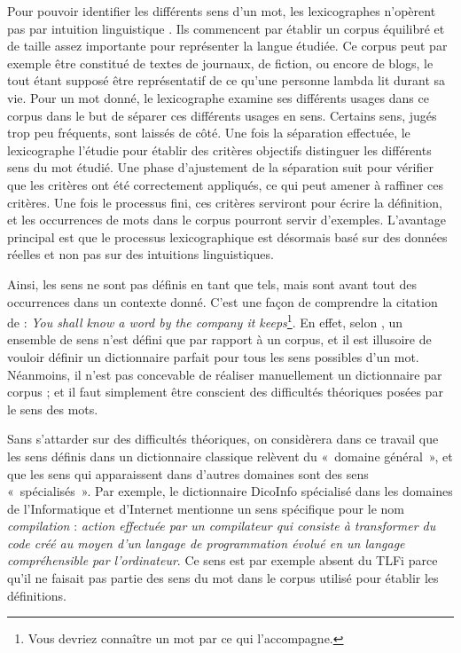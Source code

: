 Pour pouvoir identifier les différents sens d'un mot, les lexicographes
n'opèrent pas par intuition linguistique \citep{kilgarriff1997don}. Ils
commencent par établir un corpus équilibré et de taille assez importante pour
représenter la langue étudiée. Ce corpus peut par exemple être constitué de
textes de journaux, de fiction, ou encore de blogs, le tout étant supposé être
représentatif de ce qu'une personne lambda lit durant sa vie. Pour un mot
donné, le lexicographe examine ses différents usages dans ce corpus dans le but
de séparer ces différents usages en sens. Certains sens, jugés trop peu
fréquents, sont laissés de côté. Une fois la séparation effectuée, le
lexicographe l'étudie pour établir des critères objectifs distinguer les
différents sens du mot étudié. Une phase d'ajustement de la séparation suit
pour vérifier que les critères ont été correctement appliqués, ce qui peut
amener à raffiner ces critères. Une fois le processus fini, ces critères
serviront pour écrire la définition, et les occurrences de mots dans le corpus
pourront servir d'exemples. L'avantage principal est que le processus
lexicographique est désormais basé sur des données réelles et non pas sur des
intuitions linguistiques.


Ainsi, les sens ne sont pas définis en tant que tels, mais sont avant tout des
occurrences dans un contexte donné. C'est une façon de comprendre la citation
de \citep{firth1957synopsys} : \emph{You shall know a word by the company it
keeps}\footnote{Vous devriez connaître un mot par ce qui l'accompagne.}. En
effet, selon \citep{kilgarriff1997don}, un ensemble de sens n'est défini que
par rapport à un corpus, et il est illusoire de vouloir définir un dictionnaire
parfait pour tous les sens possibles d'un mot.  Néanmoins, il n'est pas
concevable de réaliser manuellement un dictionnaire par corpus ; et il faut
simplement être conscient des difficultés théoriques posées par le sens des
mots.

Sans s'attarder sur des difficultés théoriques, on considèrera dans ce travail
que les sens définis dans un dictionnaire classique relèvent du «~domaine
général~», et que les sens qui apparaissent dans d'autres domaines sont des
sens «~spécialisés~». Par exemple, le dictionnaire DicoInfo \citep{corpusolst}
spécialisé dans les domaines de l'Informatique et d'Internet mentionne un sens
spécifique pour le nom \emph{compilation} : \emph{action effectuée par un
compilateur qui consiste à transformer du code créé au moyen d'un langage de
programmation évolué en un langage compréhensible par l'ordinateur}. Ce sens
est par exemple absent du TLFi \citep{TLFi} parce qu'il ne faisait pas partie
des sens du mot dans le corpus utilisé pour établir les définitions.


